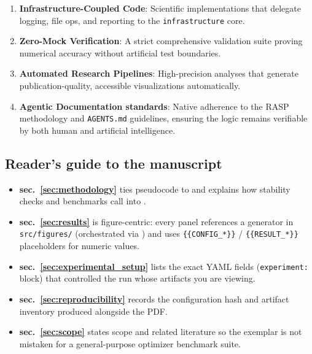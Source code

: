 \documentclass[
  english,
]{article}
\providecommand{\tightlist}{%
  \setlength{\itemsep}{0pt}\setlength{\parskip}{0pt}}
\begin{document}
\begin{enumerate}
\def\labelenumi{\arabic{enumi}.}
\tightlist
\item
  \textbf{Infrastructure-Coupled Code}: Scientific implementations that
  delegate logging, file ops, and reporting to the
  \texttt{infrastructure} core.
\item
  \textbf{Zero-Mock Verification}: A strict comprehensive validation
  suite proving numerical accuracy without artificial test boundaries.
\item
  \textbf{Automated Research Pipelines}: High-precision analyses that
  generate publication-quality, accessible visualizations automatically.
\item
  \textbf{Agentic Documentation standards}: Native adherence to the RASP
  methodology and \texttt{AGENTS.md} guidelines, ensuring the logic
  remains verifiable by both human and artificial intelligence.
\end{enumerate}

\subsection{Reader's guide to the
manuscript}\label{readers-guide-to-the-manuscript}

\begin{itemize}
\tightlist
\item
  \textbf{sec.~\ref{sec:methodology}} ties pseudocode to
   and explains how stability checks and
  benchmarks call into .
\item
  \textbf{sec.~\ref{sec:results}} is figure-centric: every panel
  references a generator in \texttt{src/figures/} (orchestrated via
  ) and uses
  \texttt{\{\{CONFIG\_*\}\}} / \texttt{\{\{RESULT\_*\}\}} placeholders
  for numeric values.
\item
  \textbf{sec.~\ref{sec:experimental_setup}} lists the exact YAML fields
  (\texttt{experiment:} block) that controlled the run whose artifacts
  you are viewing.
\item
  \textbf{sec.~\ref{sec:reproducibility}} records the configuration hash
  and artifact inventory produced alongside the PDF.
\item
  \textbf{sec.~\ref{sec:scope}} states scope and related literature so
  the exemplar is not mistaken for a general-purpose optimizer benchmark
  suite.
\end{itemize}
\end{document}
